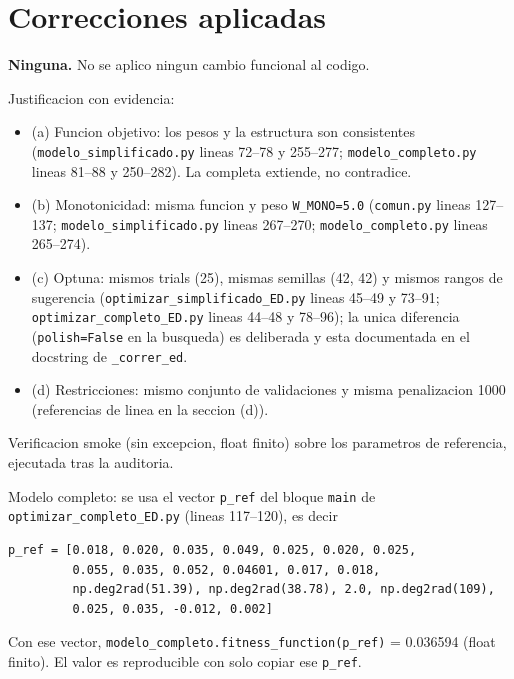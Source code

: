 \documentclass[11pt,a4paper]{article}
\newcommand{\code}[1]{\texttt{#1}}
\begin{document}
\section{Correcciones aplicadas}

\textbf{Ninguna.} No se aplico ningun cambio funcional al codigo.

Justificacion con evidencia:

\begin{itemize}[leftmargin=1.4em]
  \item (a) Funcion objetivo: los pesos y la estructura son consistentes
        (\code{modelo\_simplificado.py} lineas 72--78 y 255--277;
        \code{modelo\_completo.py} lineas 81--88 y 250--282). La completa
        extiende, no contradice.
  \item (b) Monotonicidad: misma funcion y peso \code{W\_MONO=5.0}
        (\code{comun.py} lineas 127--137; \code{modelo\_simplificado.py}
        lineas 267--270; \code{modelo\_completo.py} lineas 265--274).
  \item (c) Optuna: mismos trials (25), mismas semillas (42, 42) y mismos rangos
        de sugerencia (\code{optimizar\_simplificado\_ED.py} lineas 45--49 y
        73--91; \code{optimizar\_completo\_ED.py} lineas 44--48 y 78--96); la
        unica diferencia (\code{polish=False} en la busqueda) es deliberada y
        esta documentada en el docstring de \code{\_correr\_ed}.
  \item (d) Restricciones: mismo conjunto de validaciones y misma penalizacion
        1000 (referencias de linea en la seccion (d)).
\end{itemize}

Verificacion smoke (sin excepcion, float finito) sobre los parametros de
referencia, ejecutada tras la auditoria.

Modelo completo: se usa el vector \code{p\_ref} del bloque \code{main} de
\code{optimizar\_completo\_ED.py} (lineas 117--120), es decir

\begin{verbatim}
p_ref = [0.018, 0.020, 0.035, 0.049, 0.025, 0.020, 0.025,
         0.055, 0.035, 0.052, 0.04601, 0.017, 0.018,
         np.deg2rad(51.39), np.deg2rad(38.78), 2.0, np.deg2rad(109),
         0.025, 0.035, -0.012, 0.002]
\end{verbatim}

Con ese vector, \code{modelo\_completo.fitness\_function(p\_ref)} = 0.036594
(float finito). El valor es reproducible con solo copiar ese \code{p\_ref}.
\end{document}
